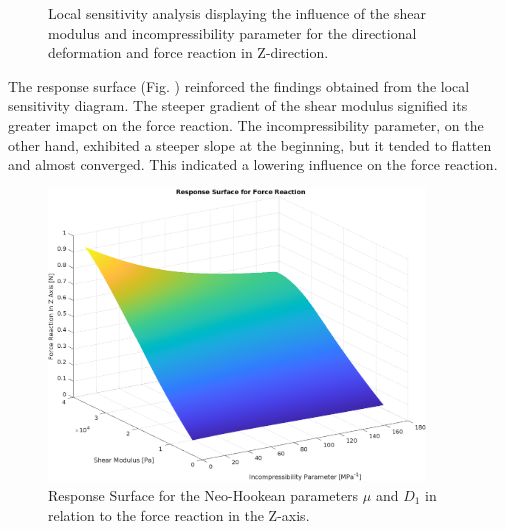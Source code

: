 \begin{figure}%
    \centering
	\caption[Local sensitivity analysis - Initial parameter range]{Local sensitivity analysis displaying the influence of the shear modulus and incompressibility parameter for the directional deformation and force reaction in Z-direction.}%
	\label{fig:fullrangelocalsensi}%
 \end{figure}

The response surface (Fig. )%
reinforced the findings obtained from the local sensitivity diagram. The steeper gradient of the shear modulus 
signified its greater imapct on the force reaction. The incompressibility parameter, on the other hand, 
exhibited a steeper slope at the beginning, but it tended to flatten and almost converged. This indicated 
a lowering influence on the force reaction.

\begin{figure}%
	\centering
   \quad
   \includegraphics[width=10cm]{Images/ifem/plat NH 4 and 2 fullrange/rsoforce.png}%
   \caption[Response surface - Force Reaction]{Response Surface for the Neo-Hookean parameters $\mu$ and $D_1$ in relation to the force reaction in the Z-axis.}%
   \label{fig:rsoforce}%
\end{figure}

